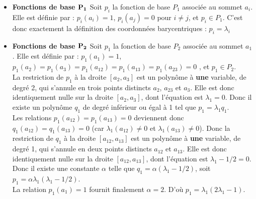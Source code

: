 \begin{itemize}
\item {\bf Fonctions de base $\bf{P_1}$} Soit $p_i$ la fonction de base $P_1$ associ\'ee au sommet $a_i$. Elle est d\'efinie par : $p_i(a_i) = 1$, $p_i(a_j)=0$ pour $i\ne j$, et $p_i \in P_1$. C'est donc exactement la d\'efinition des coordonn\'ees barycentriques : $p_i = \lambda_i$
%
\item {\bf Fonctions de base $\bf{P_2}$} Soit $p_1$ la fonction de base $P_2$ associ\'ee au sommet $a_1$. Elle est d\'efinie par : $p_1(a_1) = 1$, $p_1(a_2)=p_1(a_3)=p_1(a_{12})=p_1(a_{13})=p_1(a_{23})=0$ , et $p_1 \in P_2$.\\
La restriction de $p_1$ \`a la droite $[a_2, a_3]$ est un polyn\^ome \`a {\bf une} variable, de degr\'e 2, qui s'annule en trois points distincts $a_2$, $a_{23}$ et $a_3$. Elle est donc identiquement nulle sur la droite $[a_2, a_3]$, dont l'\'equation est $\lambda_1=0$. Donc il existe un polyn\^ome $q_1$ de degr\'e inf\'erieur ou \'egal \`a 1 tel que $p_1=\lambda_1 q_1$. \\
Les  relations $p_1(a_{12})=p_1(a_{13})=0$ deviennent donc $q_1(a_{12})=q_1(a_{13})=0$ (car $\lambda_1(a_{12}) \ne 0$ et $\lambda_1(a_{13}) \ne 0$). Donc la restriction de $q_1$ \`a la droite $[a_{12}, a_{13}]$ est un polyn\^ome \`a {\bf une} variable, de degr\'e 1, qui s'annule en deux points distincts $a_{12}$ et $a_{13}$. Elle est donc identiquement nulle sur la droite $[a_{12}, a_{13}]$, dont l'\'equation est $\lambda_1-1/2=0$. Donc il existe une constante $\alpha$  telle que $q_1=\alpha (\lambda_1-1/2)$, soit $p_1= \alpha \lambda_1 (\lambda_1-1/2)$.\\
La relation $p_1(a_1) = 1$ fournit finalement $\alpha = 2$. D'o\`u $p_1= \lambda_1 (2\lambda_1-1)$.
%
%
\end{itemize}









